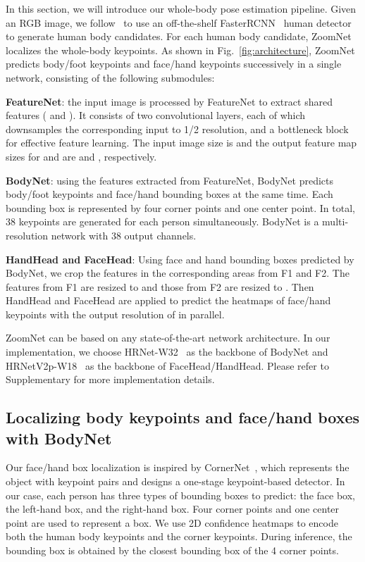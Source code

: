 \documentclass[runningheads]{llncs}
\begin{document}
	In this section, we will introduce our whole-body pose estimation pipeline. Given an RGB image, we follow~\cite{xiao2018simple,sun2019deep} to use an off-the-shelf FasterRCNN~\cite{renNIPS15fasterrcnn} human detector to generate human body candidates. For each human body candidate, ZoomNet localizes the whole-body keypoints. As shown in Fig.~\ref{fig:architecture}, ZoomNet predicts body/foot keypoints and face/hand keypoints successively in a single network, consisting of the following submodules:
	
	\textbf{FeatureNet}: the input image is processed by FeatureNet to extract shared features ( and ). It consists of two convolutional layers, each of which downsamples the corresponding input to 1/2 resolution, and a bottleneck block for effective feature learning. The input image size is  and the output feature map sizes for  and  are  and , respectively.
	
	\textbf{BodyNet}: using the features extracted from FeatureNet, BodyNet predicts body/foot keypoints and face/hand bounding boxes at the same time. Each bounding box is represented by four corner points and one center point. In total, 38 keypoints are generated for each person simultaneously. BodyNet is a multi-resolution network with 38 output channels. 
	
	\textbf{HandHead and FaceHead}: Using face and hand bounding boxes predicted by BodyNet, we crop the features in the corresponding areas from F1 and F2. The features from F1 are resized to  and those from F2 are resized to . Then HandHead and FaceHead are applied to predict the heatmaps of face/hand keypoints with the output resolution of  in parallel. 
	
	ZoomNet can be based on any state-of-the-art network architecture. In our implementation, we choose HRNet-W32~\cite{sun2019deep} as the backbone of BodyNet and HRNetV2p-W18~\cite{sun2019high} as the backbone of FaceHead/HandHead. Please refer to Supplementary for more implementation details.
	
	\subsection{Localizing body keypoints and face/hand boxes with BodyNet}
	Our face/hand box localization is inspired by CornerNet~\cite{law2018cornernet}, which represents the object with keypoint pairs and designs a one-stage keypoint-based detector. In our case, each person has three types of bounding boxes to predict: the face box, the left-hand box, and the right-hand box. Four corner points and one center point are used to represent a box. We use 2D confidence heatmaps to encode both the human body keypoints and the corner keypoints. During inference, the bounding box is obtained by the closest bounding box of the 4 corner points.
	
\end{document}
